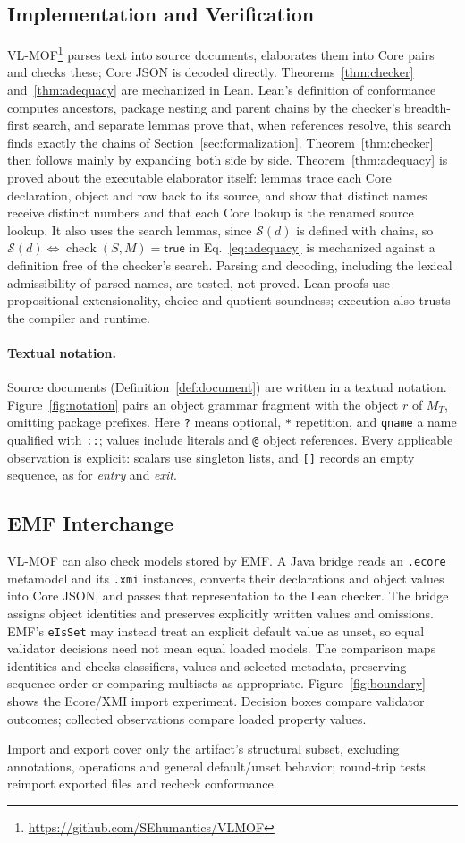 \subsection{Implementation and Verification}
VL-MOF\footnote{\url{https://github.com/SEhumantics/VLMOF}} parses text into
source documents, elaborates them into Core pairs and checks these; Core JSON is decoded
directly. Theorems~\ref{thm:checker} and~\ref{thm:adequacy} are mechanized in
Lean. Lean's definition of conformance computes ancestors, package nesting
and parent chains by the checker's breadth-first search, and separate lemmas prove
that, when references resolve, this search finds exactly the chains of
Section~\ref{sec:formalization}. Theorem~\ref{thm:checker} then follows mainly by
expanding both side by side.
Theorem~\ref{thm:adequacy} is proved about the executable elaborator itself:
lemmas trace each Core declaration, object and row back to its source, and show
that distinct names receive distinct numbers and that each Core lookup is the
renamed source lookup. It also uses the search lemmas, since $\mathcal S(d)$ is
defined with chains, so $\mathcal S(d)\Leftrightarrow\operatorname{check}(S,M)=\mathsf{true}$
in Eq.~\eqref{eq:adequacy} is mechanized against a definition free of the
checker's search. Parsing and decoding,
including the lexical admissibility of parsed names, are tested, not proved.
Lean proofs use propositional extensionality, choice and quotient soundness;
execution also trusts the compiler and runtime.

\paragraph{Textual notation.}
Source documents (Definition~\ref{def:document}) are written in a textual notation.
Figure~\ref{fig:notation} pairs an object grammar fragment with the object $r$ of
$M_T$, omitting package prefixes. Here \texttt{?} means optional, \texttt{*}
repetition, and \texttt{qname} a name qualified with \texttt{::}; values include
literals and \texttt{@} object references. Every applicable observation is
explicit: scalars use singleton lists, and \texttt{[]} records an empty sequence,
as for \emph{entry} and \emph{exit}.

\subsection{EMF Interchange}
VL-MOF can also check models stored by EMF. A Java bridge reads an \texttt{.ecore}
metamodel and its \texttt{.xmi} instances, converts their declarations and object
values into Core JSON, and passes that representation to the Lean checker.
The bridge assigns object identities and preserves explicitly written values
and omissions. EMF's \texttt{eIsSet} may instead treat an explicit default value
as unset, so equal validator decisions need not mean equal loaded models.
The comparison maps identities and checks classifiers, values and selected
metadata, preserving sequence order or comparing multisets as appropriate.
Figure~\ref{fig:boundary} shows the Ecore/XMI import experiment. Decision boxes
compare validator outcomes; collected observations compare loaded property values.

Import and export cover only the artifact's structural subset, excluding
annotations, operations and general default/unset behavior; round-trip tests
reimport exported files and recheck conformance.

